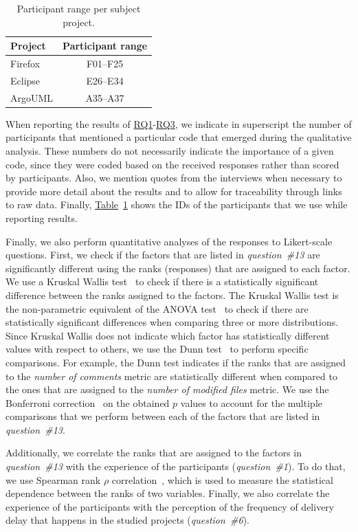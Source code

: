\begin{table}
	\footnotesize
	\centering
	\caption{Participant range per subject project.
		\label{tbl:participants}
	}
	\begin{tabular}{lc}
		\hline 
		\textbf{Project} & \textbf{Participant range}\tabularnewline
		\hline 
		\hline 
		Firefox & F01--F25\tabularnewline
		\hline 
		Eclipse & E26--E34\tabularnewline
		\hline 
		ArgoUML & A35--A37\tabularnewline
		\hline 
	\end{tabular}
\end{table}

When reporting the results of \hyperref[ch5:rq1]{RQ1}-\hyperref[ch5:rq3]{RQ3},
we indicate in superscript the number of participants that mentioned a
particular code that emerged during the qualitative analysis. These numbers do
not necessarily indicate the importance of a given code, since they were coded
based on the received responses rather than scored by participants. Also, we
mention quotes from the interviews when necessary to provide more detail about
the results and to allow for traceability through links to raw data. Finally,
\hyperref[tbl:participants]{Table}~\ref{tbl:participants} shows the IDs of the
participants that we use while reporting results.

Finally, we also perform quantitative analyses of the responses to Likert-scale
questions. First, we check if the factors that are listed in {\em question~\#13}
are significantly different using the ranks (responses) that are assigned to
each factor. We use a Kruskal Wallis test~\cite{kruskal1952use} to check if
there is a statistically significant difference between the ranks assigned to
the factors. The Kruskal Wallis test is the non-parametric equivalent of the
ANOVA test~\cite{fisher1925statistical} to check if there are statistically
significant differences when comparing three or more distributions. Since
Kruskal Wallis does not indicate which factor has statistically different values
with respect to others, we use the Dunn test~\cite{dunn1964multiple} to perform
specific comparisons. For example, the Dunn test indicates if the ranks that are
assigned to the {\em number of comments} metric are statistically different when
compared to the ones that are assigned to the {\em number of modified files}
metric. We use the Bonferroni correction~\cite{dunn1961multiple} on the obtained
$p$ values to account for the multiple comparisons that we perform between each
of the factors that are listed in {\em question~\#13}. 

Additionally, we correlate the ranks that are assigned to the factors in {\em
question~\#13} with the experience of the participants ({\em question~\#1}). To
do that, we use Spearman rank {$\rho$} correlation~\cite{spearman1904proof},
which is used to measure the statistical dependence between the ranks of two
variables. Finally, we also correlate the experience of the participants with
the perception of the frequency of delivery delay that happens in the studied
projects ({\em question~\#6}).

